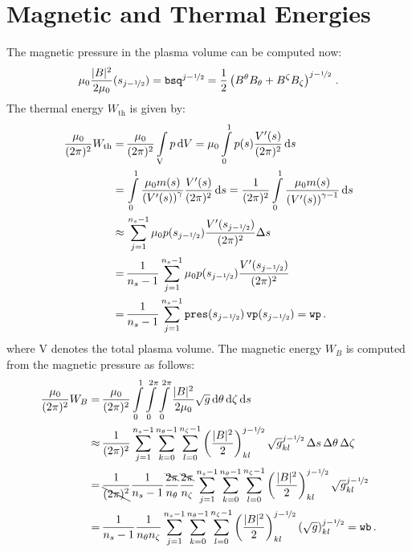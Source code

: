 \section{Magnetic and Thermal Energies}
The magnetic pressure in the plasma volume can be computed now:
\begin{equation}
  \mu_0 \frac{|B|^2}{2 \mu_0}(s_{j-\nicefrac{1}{2}}) = \texttt{bsq}^{j-\nicefrac{1}{2}} = \frac{1}{2} \left( B^\theta B_\theta + B^\zeta B_\zeta \right)^{j-\nicefrac{1}{2}} \, .
\end{equation}
The thermal energy $W_\mathrm{th}$ is given by:
\begin{align}
  \frac{\mu_0}{(2 \pi)^2} W_\mathrm{th} =&\, \frac{\mu_0}{(2 \pi)^2} \int\limits_\mathrm{V} p \,\mathrm{d}V = \mu_0 \int\limits_0^1 p(s) \frac{V'(s)}{(2 \pi)^2} \,\mathrm{d}s \nonumber \\
                 =&\, \int\limits_0^1 \frac{\mu_0 m(s)}{\left(V'(s)\right)^\gamma} \frac{V'(s)}{(2 \pi)^2} \,\mathrm{d}s
                 =  \frac{1}{(2 \pi)^2}  \int\limits_0^1 \frac{\mu_0 m(s)}{\left(V'(s)\right)^{\gamma - 1}} \,\mathrm{d}s \nonumber \\
           \approx&\, \sum\limits_{j=1}^{n_s-1} \mu_0 p(s_{j-\nicefrac{1}{2}}) \frac{V'(s_{j-\nicefrac{1}{2}})}{(2 \pi)^2} \Delta s \nonumber \\
                 =&\, \frac{1}{n_s-1} \sum\limits_{j=1}^{n_s-1} \mu_0 p(s_{j-\nicefrac{1}{2}}) \frac{V'(s_{j-\nicefrac{1}{2}})}{(2 \pi)^2} \nonumber \\
                 =&\, \frac{1}{n_s-1} \sum\limits_{j=1}^{n_s-1} \texttt{pres}(s_{j-\nicefrac{1}{2}}) \, \texttt{vp}(s_{j-\nicefrac{1}{2}}) = \texttt{wp} \, .
\end{align}
where V denotes the total plasma volume.
The magnetic energy $W_B$ is computed from the magnetic pressure as follows:
\begin{align}
  \frac{\mu_0}{(2 \pi)^2} W_B =&\, \frac{\mu_0}{(2 \pi)^2} \int\limits_0^{1} \int\limits_0^{2 \pi} \int\limits_0^{2 \pi}
                   \frac{|B|^2}{2 \mu_0} \sqrt{g} \,\mathrm{d}\theta \,\mathrm{d}\zeta \,\mathrm{d}s \nonumber \\
      \approx&\, \frac{1}{(2 \pi)^2} \sum\limits_{j=1}^{n_s-1} \sum\limits_{k=0}^{n_\theta - 1} \sum\limits_{l=0}^{n_\zeta - 1}
                   \left( \frac{|B|^2}{2} \right)^{j-\nicefrac{1}{2}}_{kl} \sqrt{g}^{j-\nicefrac{1}{2}}_{kl}
                   \,\Delta s \,\Delta \theta \,\Delta \zeta \nonumber \\
            =&\, \frac{1}{\bcancel{(2 \pi)^2}} \frac{1}{n_s-1} \frac{\bcancel{2 \pi}}{n_\theta} \frac{\bcancel{2 \pi}}{n_\zeta}
                 \sum\limits_{j=1}^{n_s-1} \sum\limits_{k=0}^{n_\theta - 1} \sum\limits_{l=0}^{n_\zeta - 1}
                   \left( \frac{|B|^2}{2} \right)^{j-\nicefrac{1}{2}}_{kl} \sqrt{g}^{j-\nicefrac{1}{2}}_{kl} \nonumber \\
            =&\, \frac{1}{n_s-1} \frac{1}{n_\theta n_\zeta}
                 \sum\limits_{j=1}^{n_s-1} \sum\limits_{k=0}^{n_\theta - 1} \sum\limits_{l=0}^{n_\zeta - 1}
                   \left( \frac{|B|^2}{2} \right)^{j-\nicefrac{1}{2}}_{kl} \left(\sqrt{g}\right)^{j-\nicefrac{1}{2}}_{kl} = \texttt{wb} \, .
\end{align}
